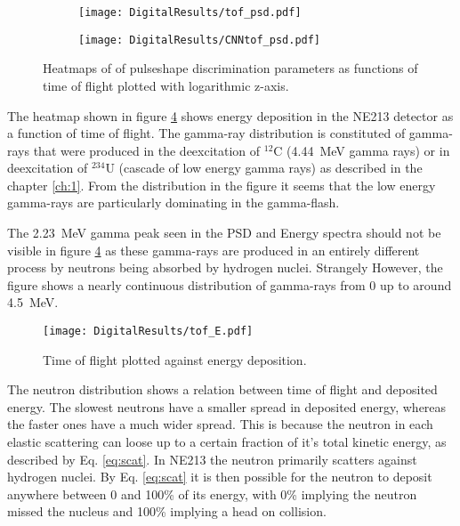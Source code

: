 \documentclass[main.tex]{subfiles}
\begin{document}
\begin{figure}
    \centering
    \begin{subfigure}[ht]{\textwidth}
        \texttt{[image: DigitalResults/tof\_psd.pdf]}
        \caption{}
        \label{fig:tof_digi_cc}
    \end{subfigure}
	\begin{subfigure}[ht]{\textwidth}
        \texttt{[image: DigitalResults/CNNtof\_psd.pdf]}
        \caption{}
        \label{fig:tof_digi_cnn}
    \end{subfigure}
    \caption[Pulse shape parameters as function of time of flight, digital setup.]{Heatmaps of of pulseshape discrimination parameters as functions of time of flight plotted with logarithmic z-axis.}
    \label{fig:tof_cc_tof_cnn}
\end{figure}

The heatmap shown in figure \ref{fig:tof_E_d} shows energy deposition in the NE213 detector as a function of time of flight. The gamma-ray distribution is constituted of gamma-rays that were produced in the deexcitation of $^\mathrm{12}$C (\SI{4.44}{MeV} gamma rays) or in deexcitation of $^\mathrm{234}$U (cascade of low energy gamma rays) as described in the chapter \ref{ch:1}. From the distribution in the figure it seems that the low energy gamma-rays are particularly dominating in the gamma-flash.

The \SI{2.23}{MeV} gamma peak seen in the PSD and Energy spectra should not be visible in figure \ref{fig:tof_E_d} as these gamma-rays are produced in an entirely different process by neutrons being absorbed by hydrogen nuclei. Strangely However, the figure shows a nearly continuous distribution of gamma-rays from 0 up to around \SI{4.5}{MeV}.

\begin{figure}[ht]
    \centering
        \texttt{[image: DigitalResults/tof\_E.pdf]}
        \caption[Time of flight plotted against energy deposition.]{Time of flight plotted against energy deposition.}
    \label{fig:tof_E_d} 
\end{figure}

The neutron distribution shows a relation between time of flight and deposited energy. The slowest neutrons have a smaller spread in deposited energy, whereas the faster ones have a much wider spread. This is because the neutron in each elastic scattering can loose up to a certain fraction of it's total kinetic energy, as described by Eq. \ref{eq:scat}. In NE213 the neutron primarily scatters against hydrogen nuclei. By Eq. \ref{eq:scat} it is then possible for the neutron to deposit anywhere between 0 and 100\% of its energy, with 0\% implying the neutron missed the nucleus and 100\% implying a head on collision.
\end{document}
